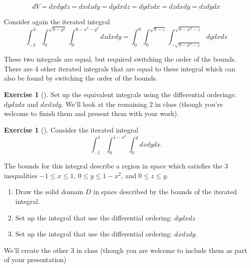 \documentclass[10pt,]{book}
\theoremstyle{plain}
\theoremstyle{definition}
\theoremstyle{definition}
\theoremstyle{definition}
\theoremstyle{definition}
\newtheorem{exploration}[project]{Exercise}
\theoremstyle{definition}
\numberwithin{equation}{section}
\newcommand{\ds}{\displaystyle}
\begin{document}
\begin{equation*}
dV=dxdydz = dxdzdy = dydxdz=dydzdx=dzdxdy=dzdydx
\end{equation*}
%
\par
Consider again the iterated integral%
\begin{equation*}
\ds \int_{-3}^3 \int_0^{\sqrt{9-y^2}}\int_0^{9-x^2-y^2} dzdxdy = \int_0^9\int_0^{\sqrt{9-z}}\int_{-\sqrt{9-x^2-z}}^{\sqrt{9-x^2-z}} dydxdz
\end{equation*}
%
\par
These two integrals are equal, but required switching the order of the bounds. There are 4 other iterated integrals that are equal to these integral which can also be found by switching the order of the bounds.%
\begin{exploration}[]\label{exploration-295}
Set up the equivalent integrals using the differential orderings: \(dydzdx\) and \(dxdzdy\). We'll look at the remaining 2 in class (though you're welcome to finish them and present them with your work).%
\end{exploration}
\begin{exploration}[]\label{exploration-296}
Consider the iterated integral%
\begin{equation*}
\int_{-1}^1\int_0^{1-x^2}\int_0^{y} dzdydx.
\end{equation*}
%
\par
The bounds for this integral describe a region in space which satisfies the 3 inequalities \(-1\leq x\leq 1\), \(0\leq y\leq 1-x^2\), and \(0\leq z\leq y\).%
\begin{enumerate}[font=\bfseries,label=(\alph*),ref=\alph*]
\item\label{task-819} Draw the solid domain \(D\) in space described by the bounds of the iterated integral.%
\item\label{task-820} Set up the integral that use the differential ordering: \(dydxdz\)%
\item\label{task-821} Set up the integral that use the differential ordering: \(dxdzdy\).%
\end{enumerate}
\bigbreak
We'll create the other 3 in class (though you are welcome to include them as part of your presentation)%
\end{exploration}
\end{document}
